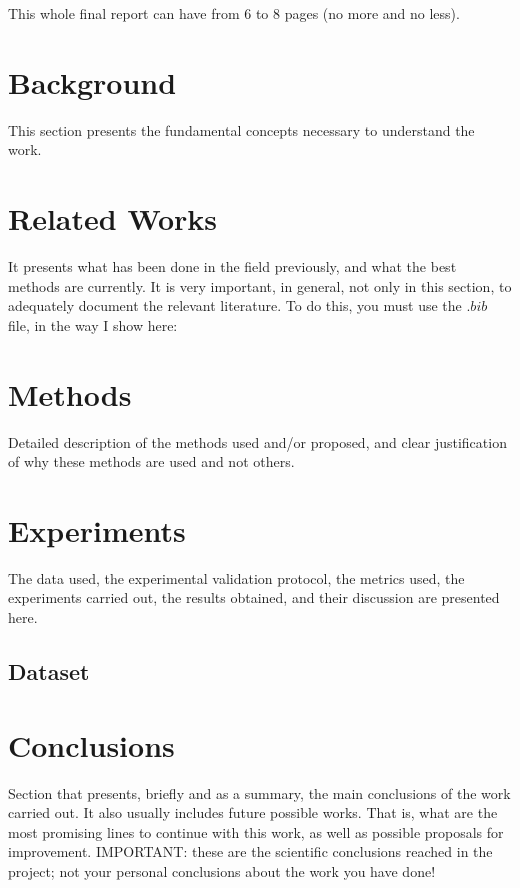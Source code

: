 \documentclass[10pt,twocolumn,letterpaper]{article}
\begin{document}
This whole final report can have from 6 to 8 pages (no more and no less). 

\section{Background}

This section presents the fundamental concepts necessary to understand the work.


\section{Related Works}

It presents what has been done in the field previously, and what the best methods are currently. It is very important, in general, not only in this section, to adequately document the relevant literature. To do this, you must use the $.bib$ file, in the way I show here: \cite{mesejo2016computer, lathuiliere2019comprehensive, vargas2023deep}

\section{Methods}

Detailed description of the methods used and/or proposed, and clear justification of why these methods are used and not others.

\section{Experiments}

The data used, the experimental validation protocol, the metrics used, the experiments carried out, the results obtained, and their discussion are presented here.

\subsection{Dataset}

\section{Conclusions}

Section that presents, briefly and as a summary, the main conclusions of the work carried out. It also usually includes future possible works. That is, what are the most promising lines to continue with this work, as well as possible proposals for improvement. IMPORTANT: these are the scientific conclusions reached in the project; not your personal conclusions about the work you have done!



{\small


}
\end{document}
